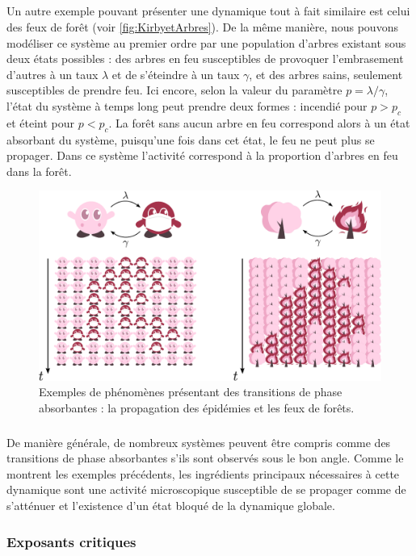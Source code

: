 \subparagraph{}Un autre exemple pouvant présenter une dynamique tout à fait similaire est celui des feux de forêt \cite{albano_spreading_1995} (voir \autoref{fig:KirbyetArbres}). De la même manière, nous pouvons modéliser ce système au premier ordre par une population d'arbres existant sous deux états possibles : des arbres en feu susceptibles de provoquer l'embrasement d'autres à un taux $\lambda$ et de s'éteindre à un taux $\gamma$, et des arbres sains, seulement susceptibles de prendre feu. Ici encore, selon la valeur du paramètre $p = \lambda/\gamma$, l'état du système à temps long peut prendre deux formes : incendié pour $p>p_c$ et éteint pour $p<p_c$. La forêt sans aucun arbre en feu correspond alors à un état absorbant du système, puisqu'une fois dans cet état, le feu ne peut plus se propager. Dans ce système l'activité correspond à la proportion d'arbres en feu dans la forêt.

\begin{figure}[h]
	\centering
	\includegraphics[width=\textwidth]{Chapitre1/Figures/TphiAbs/Kirbies.pdf}
	\caption{Exemples de phénomènes présentant des transitions de phase absorbantes : la propagation des épidémies et les feux de forêts.}
	\label{fig:KirbyetArbres}
\end{figure}

\subparagraph{}De manière générale, de nombreux systèmes peuvent être compris comme des transitions de phase absorbantes s'ils sont observés sous le bon angle. Comme le montrent les exemples précédents, les ingrédients principaux nécessaires à cette dynamique sont une activité microscopique susceptible de se propager comme de s'atténuer et l'existence d'un état bloqué de la dynamique globale.

\subsubsection{Exposants critiques}

